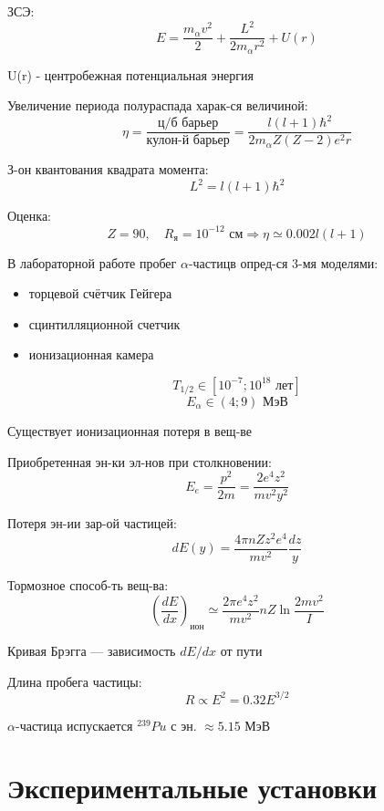 \documentclass[a4paper]{article}
\begin{document}
ЗСЭ:
\begin{equation}
E = \frac{m_\alpha v^2}{2} + \frac{L^2}{2m_\alpha r^2} + U(r)
\tag{6}
\end{equation}

U(r) - центробежная потенциальная энергия


Увеличение периода полураспада харак-ся величиной:
\begin{equation}
\eta = \frac{\text{ц/б барьер}}{\text{кулон-й барьер}} = \frac{l(l+1)\hbar^2}{2m_\alpha Z(Z-2)e^2r}
\tag{7}
\end{equation}

З-он квантования квадрата момента:
\[
L^2 = l(l+1)\hbar^2
\]

Оценка:
\[
Z=90, \quad R_\text{я} = 10^{-12} \text{ см} \Rightarrow \eta \simeq 0.002 l(l+1)
\]

В лабораторной работе пробег \(\alpha\)-частицв опред-ся 3-мя моделями:
\begin{itemize}
    \item торцевой счётчик Гейгера
    \item сцинтилляционной счетчик
    \item ионизационная камера
\end{itemize}

\[
T_{1/2} \in [10^{-7}; 10^{18} \text{ лет}]
\]
\[
E_\alpha \in (4; 9) \text{ МэВ}
\]

Существует ионизационная потеря в вещ-ве

Приобретенная эн-ки эл-нов при столкновении:
\[
E_e = \frac{p^2}{2m} = \frac{2e^4z^2}{mv^2y^2}
\]

Потеря эн-ии зар-ой частицей:
\begin{equation}
dE(y) = \frac{4\pi n Zz^2 e^4}{mv^2} \frac{dz}{y}
\tag{8}
\end{equation}

Тормозное способ-ть вещ-ва:
\[
\left( \frac{dE}{dx} \right)_{\text{ион}} \simeq \frac{2\pi e^4 z^2}{m v^2} n Z \ln \frac{2 m v^2}{I}
\]

Кривая Брэгга --- зависимость \(dE/dx\) от пути

Длина пробега частицы:
\[
R \propto E^2 = 0.32 E^{3/2}
\]

\(\alpha\)-частица испускается \(^{239}Pu\) с эн. \(\approx 5.15\) МэВ

\section{Экспериментальные установки}
\end{document}
